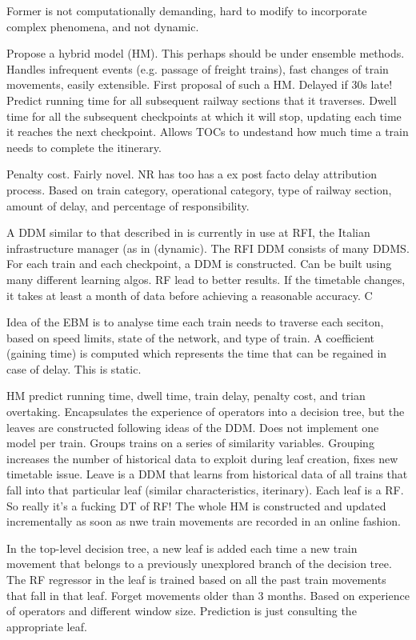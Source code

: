 \documentclass{article}
\begin{document}
Former is not computationally demanding, hard to modify to incorporate complex phenomena, and not dynamic. 

Propose a hybrid model (HM). This perhaps should be under ensemble methods. Handles infrequent events (e.g. passage of freight trains), fast changes of train movements, easily extensible. First proposal of such a HM. Delayed if 30s late! 
Predict running time for all subsequent railway sections that it traverses. Dwell time for all the subsequent checkpoints at which it will stop, updating each time it reaches the next checkpoint. Allows TOCs to undestand how much time a train needs to complete the itinerary. 

Penalty cost. Fairly novel. NR has too has a ex post facto delay attribution process. Based on train category, operational category, type of railway section, amount of delay, and percentage of responsibility. 

A DDM similar to that described in \cite{oneto_et_al_2016} is currently in use at RFI, the Italian infrastructure manager (as in \cite{oneto_et_al_2018} (dynamic). The RFI DDM consists of many DDMS. For each train and each checkpoint, a DDM is constructed.  Can be built using many different learning algos. RF lead to better results.
If the timetable changes, it takes at least a month of data before achieving a reasonable accuracy. C

Idea of the EBM is to analyse time each train needs to traverse each seciton, based on speed limits, state of the network, and type of train. A coefficient (gaining time) is computed which represents the time that can be regained in case of delay. This is static. 

HM predict running time, dwell time, train delay, penalty cost, and trian overtaking. Encapsulates the experience of operators into a decision tree, but the leaves are constructed following ideas of the DDM. Does not implement one model per train. Groups trains on a series of similarity variables. Grouping increases the number of historical data to exploit during leaf creation, fixes new timetable issue. Leave is a DDM that learns from historical data of all trains that fall into that particular leaf (similar characteristics, iterinary). Each leaf is a RF. So really it's a fucking DT of RF!
The whole HM is constructed and updated incrementally as soon as nwe train movements are recorded in an online fashion. 

In the top-level decision tree, a new leaf is added each time a new train movement that belongs to a previously unexplored branch of the decision tree. The RF regressor in the leaf is trained based on all the past train movements that fall in that leaf. Forget movements older than 3 months. Based on experience of operators and different window size. Prediction is just consulting the appropriate leaf. 
\end{document}
